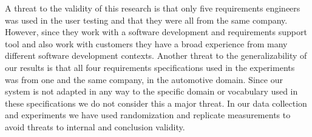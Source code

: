 \documentclass[conference]{IEEEtran}
\begin{document}
A threat to the validity of this research is that only five requirements engineers was used in the user testing and that they were all from the same company. 
However, since they work with a software development and requirements support tool and also work with customers they have a broad experience from many different software development contexts.
Another threat to the generalizability of our results is that all four requirements specifications used in the experiments was from one and the same company, in the automotive domain.
Since our system is not adapted in any way to the specific domain or vocabulary used in these specifications we do not consider this a major threat.
In our data collection and experiments we have used randomization and replicate measurements to avoid threats to internal and conclusion validity.
%
%



%
%
\end{document}
